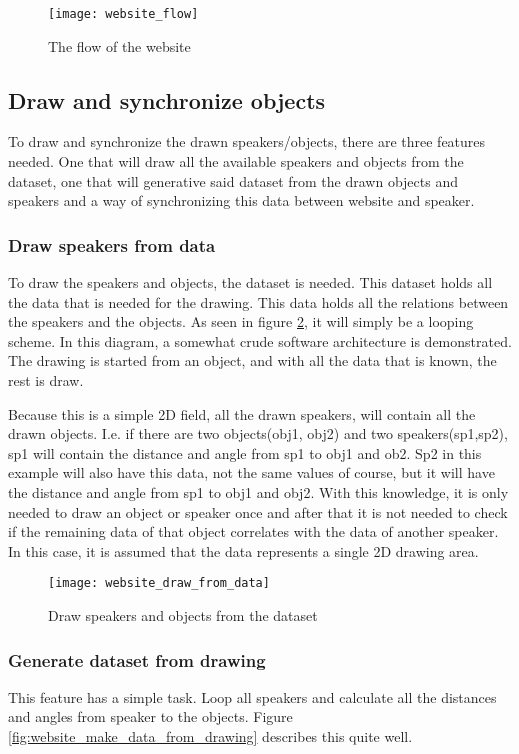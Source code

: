 \begin{figure}[H]
    \centering
    \texttt{[image: website\_flow]}
    \caption{The flow of the website}
    \label{fig:website_flow}
\end{figure}

\subsection{Draw and synchronize objects}
To draw and synchronize the drawn speakers/objects, there are three features needed.
One that will draw all the available speakers and objects from the dataset,
one that will generative said dataset from the drawn objects and speakers
and a way of synchronizing this data between website and speaker.

\subsubsection{Draw speakers from data}
To draw the speakers and objects, the dataset is needed. This dataset holds all the data that is needed for the drawing.
This data holds all the relations between the speakers and the objects.
As seen in figure \ref{fig:website_draw_from_data}, it will simply be a looping scheme.
In this diagram, a somewhat crude software architecture is demonstrated.
The drawing is started from an object, and with all the data that is known, the rest is draw.

Because this is a simple 2D field, all the drawn speakers, will contain all the drawn objects.
I.e. if there are two objects(obj1, obj2) and two speakers(sp1,sp2), sp1 will contain the distance and angle from sp1 to obj1 and ob2.
Sp2 in this example will also have this data, not the same values of course, but it will have the distance and angle from sp1 to obj1 and obj2.
With this knowledge, it is only needed to draw an object or speaker once and after that it is not needed to check if the remaining data of that object correlates with the data of another speaker.
In this case, it is assumed that the data represents a single 2D drawing area.

\begin{figure}[H]
    \centering
    \texttt{[image: website\_draw\_from\_data]}
    \caption{Draw speakers and objects from the dataset}
    \label{fig:website_draw_from_data}
\end{figure}

\subsubsection{Generate dataset from drawing}
This feature has a simple task. Loop all speakers and calculate all the distances and angles from speaker to the objects.
Figure \ref{fig:website_make_data_from_drawing} describes this quite well.

